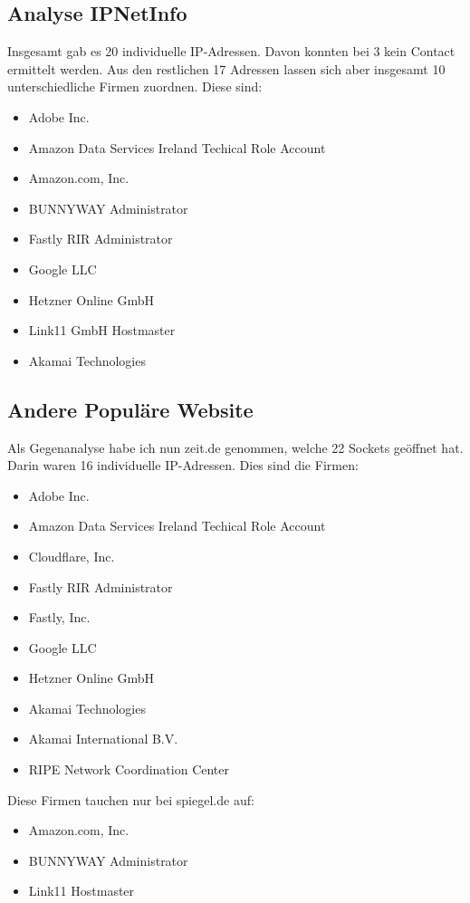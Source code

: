 \documentclass{kdiartcl}
\begin{document}
\subsection{Analyse IPNetInfo}
Insgesamt gab es 20 individuelle IP-Adressen. Davon konnten bei 3 kein Contact ermittelt werden. Aus den restlichen 17 Adressen lassen sich aber insgesamt 10 unterschiedliche Firmen zuordnen. Diese sind:
\begin{itemize}
    \item Adobe Inc.
    \item Amazon Data Services Ireland Techical Role Account
    \item Amazon.com, Inc.
    \item BUNNYWAY Administrator
    \item Fastly RIR Administrator
    \item Google LLC
    \item Hetzner Online GmbH
    \item Link11 GmbH Hostmaster
    \item Akamai Technologies
\end{itemize}

\subsection{Andere Populäre Website}
Als Gegenanalyse habe ich nun zeit.de genommen, welche 22 Sockets geöffnet hat. Darin waren 16 individuelle IP-Adressen. Dies sind die Firmen:
\begin{itemize}
    \item Adobe Inc.
    \item Amazon Data Services Ireland Techical Role Account
    \item Cloudflare, Inc.
    \item Fastly RIR Administrator
    \item Fastly, Inc.
    \item Google LLC
    \item Hetzner Online GmbH
    \item Akamai Technologies
    \item Akamai International B.V.
    \item RIPE Network Coordination Center
\end{itemize}

Diese Firmen tauchen nur bei spiegel.de auf:
\begin{itemize}
    \item Amazon.com, Inc.
    \item BUNNYWAY Administrator
    \item Link11 Hostmaster
\end{itemize}
\end{document}
